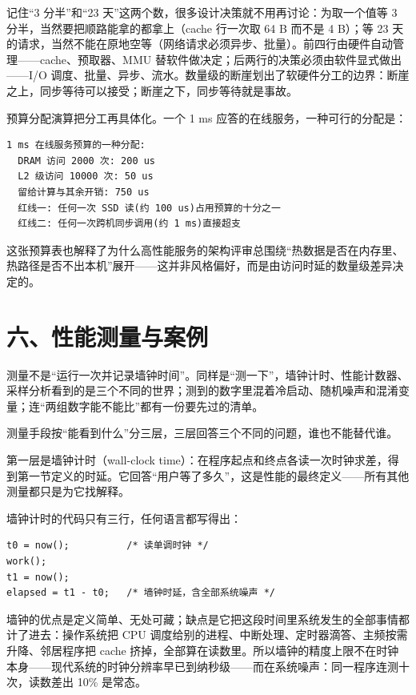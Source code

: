 记住“3 分半”和“23 天”这两个数，很多设计决策就不用再讨论：为取一个值等 3 分半，当然要把顺路能拿的都拿上（cache 行一次取 64 B 而不是 4 B）；等 23 天的请求，当然不能在原地空等（网络请求必须异步、批量）。前四行由硬件自动管理——cache、预取器、MMU 替软件做决定；后两行的决策必须由软件显式做出——I/O 调度、批量、异步、流水。数量级的断崖划出了软硬件分工的边界：断崖之上，同步等待可以接受；断崖之下，同步等待就是事故。

预算分配演算把分工再具体化。一个 1 ms 应答的在线服务，一种可行的分配是：

\begin{lstlisting}
1 ms 在线服务预算的一种分配:
  DRAM 访问 2000 次: 200 us
  L2 级访问 10000 次: 50 us
  留给计算与其余开销: 750 us
  红线一: 任何一次 SSD 读(约 100 us)占用预算的十分之一
  红线二: 任何一次跨机同步调用(约 1 ms)直接超支
\end{lstlisting}

这张预算表也解释了为什么高性能服务的架构评审总围绕“热数据是否在内存里、热路径是否不出本机”展开——这并非风格偏好，而是由访问时延的数量级差异决定的。

\section{六、性能测量与案例}

测量不是“运行一次并记录墙钟时间”。同样是“测一下”，墙钟计时、性能计数器、采样分析看到的是三个不同的世界；测到的数字里混着冷启动、随机噪声和混淆变量；连“两组数字能不能比”都有一份要先过的清单。

测量手段按“能看到什么”分三层，三层回答三个不同的问题，谁也不能替代谁。

第一层是墙钟计时（wall-clock time）：在程序起点和终点各读一次时钟求差，得到第一节定义的时延。它回答“用户等了多久”，这是性能的最终定义——所有其他测量都只是为它找解释。

墙钟计时的代码只有三行，任何语言都写得出：

\begin{lstlisting}
t0 = now();          /* 读单调时钟 */
work();
t1 = now();
elapsed = t1 - t0;   /* 墙钟时延，含全部系统噪声 */
\end{lstlisting}

墙钟的优点是定义简单、无处可藏；缺点是它把这段时间里系统发生的全部事情都计了进去：操作系统把 CPU 调度给别的进程、中断处理、定时器滴答、主频按需升降、邻居程序把 cache 挤掉，全部算在读数里。所以墙钟的精度上限不在时钟本身——现代系统的时钟分辨率早已到纳秒级——而在系统噪声：同一程序连测十次，读数差出 10\% 是常态。

